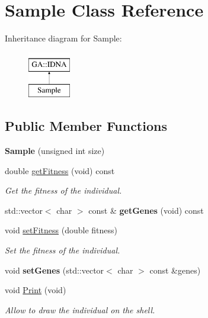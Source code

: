 \hypertarget{class_sample}{}\section{Sample Class Reference}
\label{class_sample}
Inheritance diagram for Sample\+:\begin{figure}[H]
\begin{center}
\leavevmode
\includegraphics[height=2.000000cm]{class_sample}
\end{center}
\end{figure}
\subsection*{Public Member Functions}
\begin{DoxyCompactItemize}
\item 
\hypertarget{class_sample_a69ad2d013b9bfaa1854f0a5aab0af1d6}{}{\bfseries Sample} (unsigned int size)\label{class_sample_a69ad2d013b9bfaa1854f0a5aab0af1d6}

\item 
double \hyperlink{class_sample_af0f18314b7d7358ad902c1455e2e6fe4}{get\+Fitness} (void) const 
\begin{DoxyCompactList}\small\item\em Get the fitness of the individual. \end{DoxyCompactList}\item 
\hypertarget{class_sample_ac0f21947d65db7e86ca9fc049d94e3b3}{}std\+::vector$<$ char $>$ const \& {\bfseries get\+Genes} (void) const \label{class_sample_ac0f21947d65db7e86ca9fc049d94e3b3}

\item 
void \hyperlink{class_sample_a60c82bf10891c8800a1c364814184703}{set\+Fitness} (double fitness)
\begin{DoxyCompactList}\small\item\em Set the fitness of the individual. \end{DoxyCompactList}\item 
\hypertarget{class_sample_a4388d9cca9b072d23d4c8042b24b8dd2}{}void {\bfseries set\+Genes} (std\+::vector$<$ char $>$ const \&genes)\label{class_sample_a4388d9cca9b072d23d4c8042b24b8dd2}

\item 
\hypertarget{class_sample_a7b053e51193183874f43781970be2ab1}{}void \hyperlink{class_sample_a7b053e51193183874f43781970be2ab1}{Print} (void)\label{class_sample_a7b053e51193183874f43781970be2ab1}

\begin{DoxyCompactList}\small\item\em Allow to draw the individual on the shell. \end{DoxyCompactList}\end{DoxyCompactItemize}


